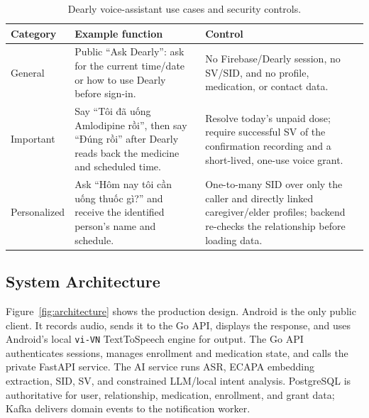 \begin{table}[H]
\centering
\begin{tabularx}{\textwidth}{>{\raggedright\arraybackslash}p{2.2cm}X>{\raggedright\arraybackslash}p{3.2cm}}
\toprule
\textbf{Category} & \textbf{Example function} & \textbf{Control} \\
\midrule
General & Public ``Ask Dearly'': ask for the current time/date or how to use Dearly before sign-in. & No Firebase/Dearly session, no SV/SID, and no profile, medication, or contact data. \\
\addlinespace[3pt]
Important & Say ``Tôi đã uống Amlodipine rồi'', then say ``Đúng rồi'' after Dearly reads back the medicine and scheduled time. & Resolve today's unpaid dose; require successful SV of the confirmation recording and a short-lived, one-use voice grant. \\
\addlinespace[3pt]
Personalized & Ask ``Hôm nay tôi cần uống thuốc gì?'' and receive the identified person's name and schedule. & One-to-many SID over only the caller and directly linked caregiver/elder profiles; backend re-checks the relationship before loading data. \\
\bottomrule
\end{tabularx}
\caption{Dearly voice-assistant use cases and security controls.}
\label{tab:use-cases}
\end{table}

\subsection{\hspace{0.15em}System Architecture}
Figure~\ref{fig:architecture} shows the production design. Android is the only public client. It records audio, sends it to the Go API, displays the response, and uses Android's local \texttt{vi-VN} TextToSpeech engine for output. The Go API authenticates sessions, manages enrollment and medication state, and calls the private FastAPI service. The AI service runs ASR, ECAPA embedding extraction, SID, SV, and constrained LLM/local intent analysis. PostgreSQL is authoritative for user, relationship, medication, enrollment, and grant data; Kafka delivers domain events to the notification worker.


